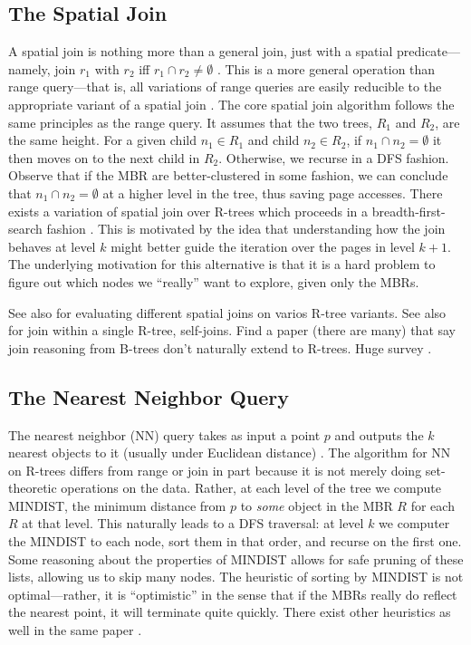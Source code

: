 \subsection{The Spatial Join}
A spatial join is nothing more than a general join, just with a spatial predicate---namely, join $r_1$ with $r_2$ iff $r_1\cap r_2\neq\emptyset$ \cite{brinkhoffkriegelseeger93}.
This is a more general operation than range query---that is, all variations of range queries are easily reducible to the appropriate variant of a spatial join \cite{gaedegunther98}.
The core spatial join algorithm \cite{brinkhoffkriegelseeger93} follows the same principles as the range query.
It assumes that the two trees, $R_1$ and $R_2$, are the same height.
For a given child $n_1\in R_1$ and child $n_2\in R_2$, if $n_1\cap n_2=\emptyset$ it then moves on to the next child in $R_2$.
Otherwise, we recurse in a DFS fashion.
Observe that if the MBR are better-clustered in some fashion, we can conclude that $n_1\cap n_2=\emptyset$ at a higher level in the tree, thus saving page accesses.
There exists a variation of spatial join over R-trees which proceeds in a breadth-first-search fashion \cite{huangjingrundensteiner97}.
This is motivated by the idea that understanding how the join behaves at level $k$ might better guide the iteration over the pages in level $k+1$.
The underlying motivation for this alternative is that it is a hard problem to figure out which nodes we ``really'' want to explore, given only the MBRs.

See also \cite{papadopoulosrigauxscholl99} for evaluating different spatial joins on varios R-tree variants.
See also \cite{vassilakopouloscorralkaranikolas11} for join within a single R-tree, self-joins.
Find a paper (there are many) that say join reasoning from B-trees don't naturally extend to R-trees.
Huge survey \cite{jacoxsamet07}.

\subsection{The Nearest Neighbor Query}
The nearest neighbor (NN) query takes as input a point $p$ and outputs the $k$ nearest objects to it (usually under Euclidean distance) \cite{roussopouloskelleyvincent95}.
The algorithm for NN on R-trees differs from range or join in part because it is not merely doing set-theoretic operations on the data. 
Rather, at each level of the tree we compute MINDIST, the minimum distance from $p$ to \emph{some} object in the MBR $R$ for each $R$ at that level.
This naturally leads to a DFS traversal: at level $k$ we computer the MINDIST to each node, sort them in that order, and recurse on the first one.
Some reasoning about the properties of MINDIST allows for safe pruning of these lists, allowing us to skip many nodes.
The heuristic of sorting by MINDIST is not optimal---rather, it is ``optimistic'' in the sense that if the MBRs really do reflect the nearest point, it will terminate quite quickly.
There exist other heuristics as well in the same paper \cite{roussopouloskelleyvincent95}.

